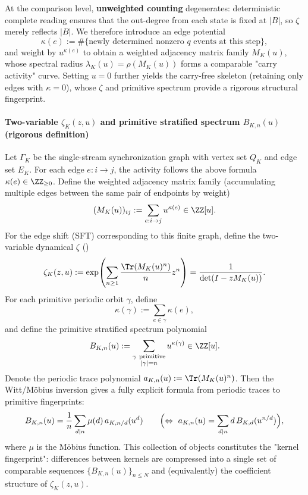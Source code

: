 At the comparison level, \textbf{unweighted counting} degenerates: deterministic complete reading ensures that the out-degree from each state is fixed at $|B|$, so $\zeta$ merely reflects $|B|$. We therefore introduce an edge potential
\[
\kappa(e):=\#\{\text{newly determined nonzero }q\text{ events at this step}\},
\]
and weight by $u^{\kappa(e)}$ to obtain a weighted adjacency matrix family $M_K(u)$, whose spectral radius $\lambda_K(u)=\rho(M_K(u))$ forms a comparable "carry activity" curve. Setting $u=0$ further yields the carry-free skeleton (retaining only edges with $\kappa=0$), whose $\zeta$ and primitive spectrum provide a rigorous structural fingerprint.

\paragraph{Two-variable \texorpdfstring{$\zeta_K(z,u)$}{zeta(z,u)} and primitive stratified spectrum \texorpdfstring{$B_{K,n}(u)$}{B\_{K,n}(u)} (rigorous definition)}
Let $\Gamma_K$ be the single-stream synchronization graph with vertex set $Q_K$ and edge set $E_K$. For each edge $e:i\to j$, the activity follows the above formula $\kappa(e)\in\ZZ_{\ge 0}$. Define the weighted adjacency matrix family (accumulating multiple edges between the same pair of endpoints by weight)
\[
(M_K(u))_{ij}:=\sum_{e:i\to j}u^{\kappa(e)}\in\ZZ[u].
\]
For the edge shift (SFT) corresponding to this finite graph, define the two-variable dynamical $\zeta$ (\cite{BrinStuck2002,ParryPollicott1990Zeta})
\[
\zeta_K(z,u)
:=\exp\!\left(\sum_{n\ge 1}\frac{\Tr(M_K(u)^n)}{n}z^n\right)
=\frac{1}{\det(I-zM_K(u))}.
\]
For each primitive periodic orbit $\gamma$, define
\[
\kappa(\gamma):=\sum_{e\in\gamma}\kappa(e),
\]
and define the primitive stratified spectrum polynomial
\[
B_{K,n}(u):=\sum_{\substack{\gamma\ \mathrm{primitive}\\ |\gamma|=n}}u^{\kappa(\gamma)}\in\ZZ[u].
\]
Denote the periodic trace polynomial $a_{K,n}(u):=\Tr(M_K(u)^n)$. Then the Witt/M\"obius inversion gives a fully explicit formula from periodic traces to primitive fingerprints:
\[
B_{K,n}(u)=\frac{1}{n}\sum_{d\mid n}\mu(d)\,a_{K,n/d}(u^d)
\qquad\Bigl(\Leftrightarrow\ a_{K,n}(u)=\sum_{d\mid n} d\,B_{K,d}(u^{n/d})\Bigr),
\]
where $\mu$ is the M\"obius function. This collection of objects constitutes the "kernel fingerprint": differences between kernels are compressed into a single set of comparable sequences $\{B_{K,n}(u)\}_{n\le N}$ and (equivalently) the coefficient structure of $\zeta_K(z,u)$.


